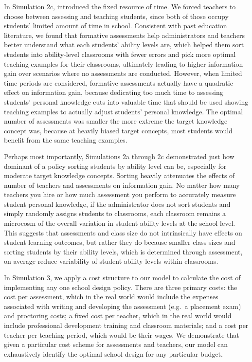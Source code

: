 \documentclass[10pt, letterpaper]{apa6}
\begin{document}
In Simulation 2c, introduced the fixed resource of time. We forced
teachers to choose between assessing and teaching students, since both
of those occupy students' limited amount of time in school. Consistent
with past education literature, we found that formative assessments help
administrators and teachers better understand what each students'
ability levels are, which helped them sort students into ability-level
classrooms with fewer errors and pick more optimal teaching examples for
their classrooms, ultimately leading to higher information gain over
scenarios where no assessments are conducted. However, when limited time
periods are considered, formative assessments actually have a quadratic
effect on information gain, because dedicating too much time to
assessing students' personal knowledge cuts into valuable time that
should be used showing teaching examples to actually adjust students'
personal knowledge. The optimal number of assessments was smaller the
more extreme the target knowledge concept was, because at heavily biased
target concepts, most students would benefit from the same teaching
examples.

Perhaps most importantly, Simulations 2a through 2c demonstrated just
how dominant of a policy sorting students by ability level can be,
especially for moderate target knowledge concepts. Sorting heavily
attenuates the effects of number of teachers and assessments on
information gain. No matter how many teachers you hire or how much
assessment you perform to accurately measure student personal knowledge,
if the administrator does not sort students and simply randomly assigns
students to classrooms, each classroom remains a microcosm of the
overall variation in student ability levels at the school level. This
suggests that assessments and class size do not intrinsically have
effects on student learning outcomes, but rather they do because smaller
class sizes and sorting students by their ability levels, which is
determined through assessment, on average reduce variability of student
ability levels within classrooms.

In Simulation 3, we apply a cost structure to our model to calculate the
cost of implementing any one school design policy. There are three
primary costs: the cost per assessment, which in the real world would
include the expenses associated with writing and developing the
assessment (e.g.~a placement exam) and proctoring costs; a fixed cost
per teacher, which in the real world would include professional
development training and classroom materials; and a cost per teacher per
teaching period, which would be their wages. We demonstrate that given a
particular cost scheme for assessments and teachers, our model can
exhaustively identify the optimal school design for any particular
budget.
\end{document}
